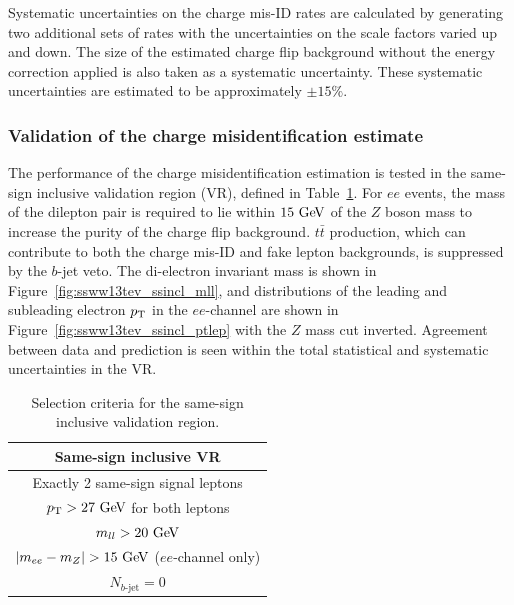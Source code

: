 Systematic uncertainties on the charge mis-ID rates are calculated by generating two additional sets of rates with the uncertainties on the scale factors varied up and down.
The size of the estimated charge flip background without the energy correction applied is also taken as a systematic uncertainty.
These systematic uncertainties are estimated to be approximately $\pm 15\%$.

\subsubsection{Validation of the charge misidentification estimate}\label{ssww13tev:ssincl_vr}

The performance of the charge misidentification estimation is tested in the same-sign inclusive validation region (VR), defined in Table~\ref{tab:ssww13tev_ssincl_vr_def}.
For $ee$ events, the mass of the dilepton pair is required to lie within $15\gev$ of the $Z$ boson mass to increase the purity of the charge flip background.
$t\bar{t}$ production, which can contribute to both the charge mis-ID and fake lepton backgrounds, is suppressed by the $b$-jet veto.
The di-electron invariant mass is shown in Figure~\ref{fig:ssww13tev_ssincl_mll}, and distributions of the leading and subleading electron $p_{\mathrm{T}}$ in the $ee$-channel are shown in Figure~\ref{fig:ssww13tev_ssincl_ptlep} with the $Z$ mass cut inverted.
Agreement between data and prediction is seen within the total statistical and systematic uncertainties in the VR.

\begin{table}[htbp]
  \centering
  \begin{tabular}{c}
    Same-sign inclusive VR \\
    \hline\hline
    Exactly 2 same-sign signal leptons\\
    $\pt > 27\gev$ for both leptons \\
    $m_{ll} > 20\gev$\\
    $|m_{ee} - m_Z| > 15\gev$ ($ee$-channel only) \\
    $N_{b\textrm{-jet}} = 0$\\
    \hline
  \end{tabular}
  \caption{Selection criteria for the same-sign inclusive validation region.}
  \label{tab:ssww13tev_ssincl_vr_def}
\end{table}

